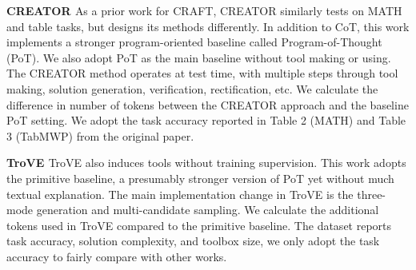 \noindent \textbf{CREATOR \citep{qian2023creator}} \quad
As a prior work for CRAFT, CREATOR similarly tests on MATH and table tasks, but designs its methods differently. In addition to CoT, this work implements a stronger program-oriented baseline called Program-of-Thought (PoT). We also adopt PoT as the main baseline without tool making or using. The CREATOR method operates at test time, with multiple steps through tool making, solution generation, verification, rectification, etc. We calculate the difference in number of tokens between the CREATOR approach and the baseline PoT setting.
We adopt the task accuracy reported in Table 2 (MATH) and Table 3 (TabMWP) from the original paper.

\noindent \textbf{TroVE \citep{wang2024trove}} \quad
TroVE also induces tools without training supervision. This work adopts the primitive baseline, a presumably stronger version of PoT yet without much textual explanation. The main implementation change in TroVE is the three-mode generation and multi-candidate sampling. We calculate the additional tokens used in TroVE compared to the primitive baseline.
The dataset reports task accuracy, solution complexity, and toolbox size, we only adopt the task accuracy to fairly compare with other works.




